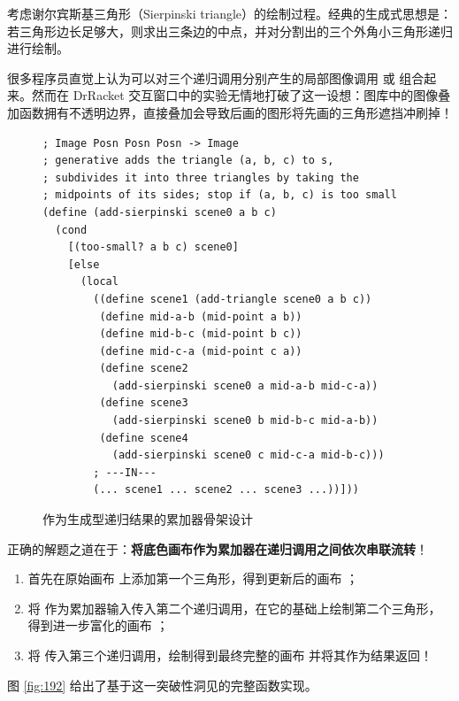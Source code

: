 考虑谢尔宾斯基三角形（Sierpinski triangle）的绘制过程。经典的生成式思想是：若三角形边长足够大，则求出三条边的中点，并对分割出的三个外角小三角形递归进行绘制。

很多程序员直觉上认为可以对三个递归调用分别产生的局部图像调用  或  组合起来。然而在 DrRacket 交互窗口中的实验无情地打破了这一设想：图库中的图像叠加函数拥有不透明边界，直接叠加会导致后画的图形将先画的三角形遮挡冲刷掉！

\begin{figure}[htbp]
  \centering
\begin{lstlisting}[language=BSL, basicstyle=\scriptsize\ttfamily]
; Image Posn Posn Posn -> Image
; generative adds the triangle (a, b, c) to s,
; subdivides it into three triangles by taking the
; midpoints of its sides; stop if (a, b, c) is too small
(define (add-sierpinski scene0 a b c)
  (cond
    [(too-small? a b c) scene0]
    [else
      (local
        ((define scene1 (add-triangle scene0 a b c))
         (define mid-a-b (mid-point a b))
         (define mid-b-c (mid-point b c))
         (define mid-c-a (mid-point c a))
         (define scene2
           (add-sierpinski scene0 a mid-a-b mid-c-a))
         (define scene3
           (add-sierpinski scene0 b mid-b-c mid-a-b))
         (define scene4
           (add-sierpinski scene0 c mid-c-a mid-b-c)))
        ; ---IN---
        (... scene1 ... scene2 ... scene3 ...))]))
\end{lstlisting}
  \caption{作为生成型递归结果的累加器骨架设计}
  \label{fig:191}
\end{figure}

正确的解题之道在于：\textbf{将底色画布作为累加器在递归调用之间依次串联流转}！
\begin{enumerate}
  \item 首先在原始画布  上添加第一个三角形，得到更新后的画布 ；
  \item 将  作为累加器输入传入第二个递归调用，在它的基础上绘制第二个三角形，得到进一步富化的画布 ；
  \item 将  传入第三个递归调用，绘制得到最终完整的画布  并将其作为结果返回！
\end{enumerate}

图 \ref{fig:192} 给出了基于这一突破性洞见的完整函数实现。

